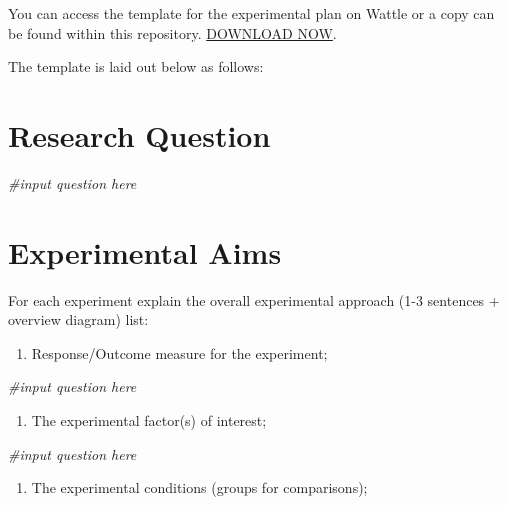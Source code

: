 \documentclass[
]{book}
\newenvironment{Shaded}{\begin{snugshade}}{\end{snugshade}}
\newcommand{\CommentTok}[1]{\textcolor[rgb]{0.56,0.35,0.01}{\textit{#1}}}
\providecommand{\tightlist}{%
  \setlength{\itemsep}{0pt}\setlength{\parskip}{0pt}}
\begin{document}
You can access the template for the experimental plan on Wattle or a copy can be found within this repository. \href{\%22pdfs/3.\%20Statistical\%20Methods\%20in\%20Biology\%20-\%20Chapter\%203.pdf\%22}{DOWNLOAD NOW}.

The template is laid out below as follows:

\hypertarget{research-question}{%
\section{Research Question}\label{research-question}}

\begin{Shaded}
\begin{Highlighting}[]
\CommentTok{\#input question here}
\end{Highlighting}
\end{Shaded}

\hypertarget{experimental-aims}{%
\section{Experimental Aims}\label{experimental-aims}}

For each experiment explain the overall experimental approach (1-3 sentences + overview diagram) list:

\begin{enumerate}
\def\labelenumi{\arabic{enumi})}
\tightlist
\item
  Response/Outcome measure for the experiment;
\end{enumerate}

\begin{Shaded}
\begin{Highlighting}[]
\CommentTok{\#input question here}
\end{Highlighting}
\end{Shaded}

\begin{enumerate}
\def\labelenumi{\arabic{enumi})}
\setcounter{enumi}{1}
\tightlist
\item
  The experimental factor(s) of interest;
\end{enumerate}

\begin{Shaded}
\begin{Highlighting}[]
\CommentTok{\#input question here}
\end{Highlighting}
\end{Shaded}

\begin{enumerate}
\def\labelenumi{\arabic{enumi})}
\setcounter{enumi}{2}
\tightlist
\item
  The experimental conditions (groups for comparisons);
\end{enumerate}
\end{document}
